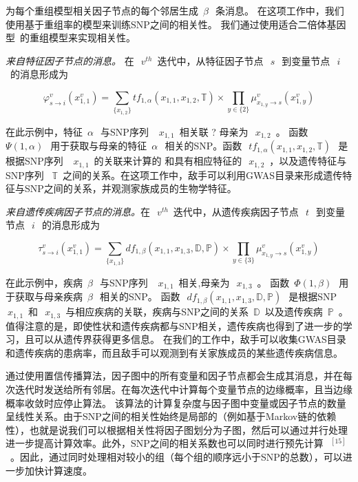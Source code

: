 为每个重组模型相关因子节点的每个邻居生成~$\beta~$~条消息。 在这项工作中，我们使用基于重组率的模型来训练SNP之间的相关性。 我们通过使用适合二倍体基因型~\cite{marchini2007newa}的重组模型来实现相关性。

\emph{来自特征因子节点的消息。} 在~$~v^{th}$~迭代中，从特征因子节点~$~s~$~到变量节点~$~i~$~的消息形成为

\begin{equation}
\label{eq:trait-message}
\varphi_{s \rightarrow i}^v(x_{1,1}^v) =  \sum_{\{x_{1,2}\}}tf_{1,\alpha}(x_{1,1},x_{1,2},\mathbb{T}) \times  \prod_{y \in \{2\}} \mu_{x_{1,y} \rightarrow s}^v(x_{1,y}^v)
\end{equation}

在此示例中，特征~$\alpha~$~与SNP序列 ~$~x_{1,1}$~相关联
? 母亲为~$~x_{1,2}$~。 函数~$\Psi(1,\alpha)~$~用于获取与母亲的特征~$\alpha~$~相关的SNP。函数~$~tf_{1,\alpha}(x_{1,1},x_{1,2},\mathbb{T})~$~是根据SNP序列 ~$~x_{1,1}$~的关联来计算的 和具有相应特征的~$~x_{1,2}$~，以及遗传特征与SNP序列 ~$\mathbb{T}$~之间的关系。在这项工作中，敌手可以利用GWAS目录来形成遗传特征与SNP之间的关系，并观测家族成员的生物学特征。

\emph{来自遗传疾病因子节点的消息。}在~$~v^{th}$~迭代中，从遗传疾病因子节点~$~t~$~到变量节点~$~i~$~的消息形成为

\begin{equation}
\label{eq:disease-messages}
\tau_{s \rightarrow i}^v(x_{1,1}^v) =  \sum_{\{x_{1,3}\}}df_{1,\beta}(x_{1,1},x_{1,3},\mathbb{D},\mathbb{P}) \times  \prod_{y \in \{3\}} \mu_{x_{1,y} \rightarrow s}^v(x_{1,y}^v)
\end{equation}

在此示例中，疾病~$\beta~$~与SNP序列 ~$~x_{1,1}$~相关,母亲为~$~x_{1,3}$~。 函数~$\Phi(1,\beta)~$~用于获取与母亲疾病~$\beta~$~相关的SNP。 函数~$~df_{1,\beta}(x_{1,1},x_{1,3},\mathbb{D}, \mathbb{P})~$~是根据SNP ~$~x_{1,1}$~和~$~x_{1,3}$~与相应疾病的关联，疾病与SNP之间的关系~$\mathbb{D}$~以及遗传疾病~$\mathbb{P}$~。
值得注意的是，即使性状和遗传疾病都与SNP相关，遗传疾病也得到了进一步的学习，且可以从遗传界获得更多信息。 在我们的工作中，敌手可以收集GWAS目录和遗传疾病的患病率，而且敌手可以观测到有关家族成员的某些遗传疾病信息。

通过使用置信传播算法，因子图中的所有变量和因子节点都会生成其消息，并在每次迭代时发送给所有邻居。在每次迭代中计算每个变量节点的边缘概率，且当边缘概率收敛时应停止算法。
该算法的计算复杂度与因子图中变量或因子节点的数量呈线性关系。由于SNP之间的相关性始终是局部的（例如基于Markov链的依赖性），也就是说我们可以根据相关性将因子图划分为子图，然后可以通过并行处理进一步提高计算效率。此外，SNP之间的相关系数也可以同时进行预先计算~$~^{[15]}$~。因此，通过同时处理相对较小的组（每个组的顺序远小于SNP的总数），可以进一步加快计算速度。


